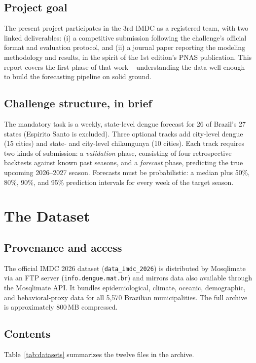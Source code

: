\documentclass[11pt]{report}
\begin{document}
\section{Project goal}
The present project participates in the 3rd IMDC as a registered team, with two linked deliverables: (i) a competitive submission following the challenge's official format and evaluation protocol, and (ii) a journal paper reporting the modeling methodology and results, in the spirit of the 1st edition's PNAS publication. This report covers the first phase of that work -- understanding the data well enough to build the forecasting pipeline on solid ground.

\section{Challenge structure, in brief}
The mandatory task is a weekly, state-level dengue forecast for 26 of Brazil's 27 states (Espirito Santo is excluded). Three optional tracks add city-level dengue (15 cities) and state- and city-level chikungunya (10 cities). Each track requires two kinds of submission: a \emph{validation} phase, consisting of four retrospective backtests against known past seasons, and a \emph{forecast} phase, predicting the true upcoming 2026--2027 season. Forecasts must be probabilistic: a median plus 50\%, 80\%, 90\%, and 95\% prediction intervals for every week of the target season.

\chapter{The Dataset}

\section{Provenance and access}
The official IMDC 2026 dataset (\texttt{data\_imdc\_2026}) is distributed by Mosqlimate via an FTP server (\texttt{info.dengue.mat.br}) and mirrors data also available through the Mosqlimate API. It bundles epidemiological, climate, oceanic, demographic, and behavioral-proxy data for all 5{,}570 Brazilian municipalities. The full archive is approximately 800\,MB compressed.

\section{Contents}
Table~\ref{tab:datasets} summarizes the twelve files in the archive.
\end{document}
